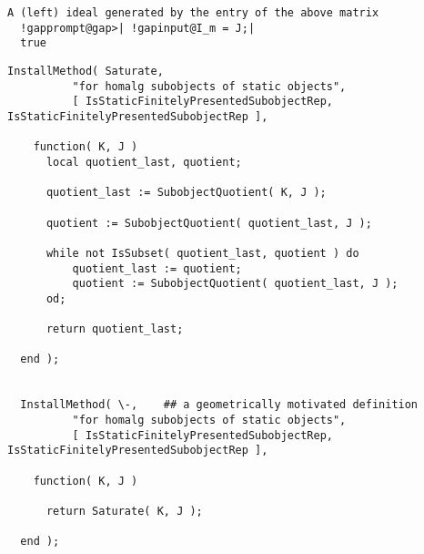 \documentclass[a4paper,11pt]{report}
\begin{document}
{{{\begin{Verbatim}[commandchars=!@|,fontsize=\small,frame=single,label=Example]
  A (left) ideal generated by the entry of the above matrix
  !gapprompt@gap>| !gapinput@I_m = J;|
  true
\end{Verbatim}
 

 
\begin{Verbatim}[fontsize=\small,frame=single,label=Code]
  InstallMethod( Saturate,
          "for homalg subobjects of static objects",
          [ IsStaticFinitelyPresentedSubobjectRep, IsStaticFinitelyPresentedSubobjectRep ],
          
    function( K, J )
      local quotient_last, quotient;
      
      quotient_last := SubobjectQuotient( K, J );
      
      quotient := SubobjectQuotient( quotient_last, J );
      
      while not IsSubset( quotient_last, quotient ) do
          quotient_last := quotient;
          quotient := SubobjectQuotient( quotient_last, J );
      od;
      
      return quotient_last;
      
  end );
  
  
  InstallMethod( \-,	## a geometrically motivated definition
          "for homalg subobjects of static objects",
          [ IsStaticFinitelyPresentedSubobjectRep, IsStaticFinitelyPresentedSubobjectRep ],
          
    function( K, J )
      
      return Saturate( K, J );
      
  end );
\end{Verbatim}
 }

 }

  }

   
\end{document}
